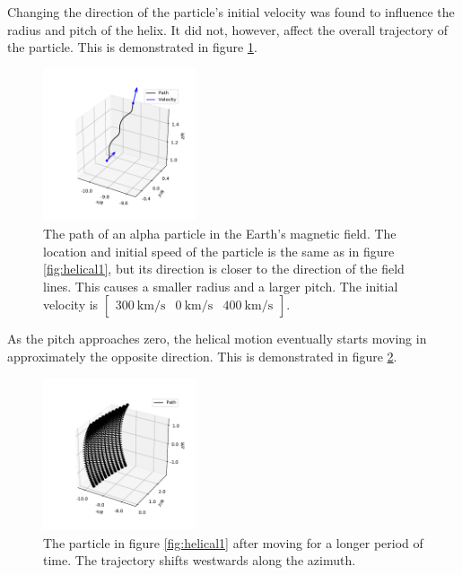 \documentclass[5p,sort&compress]{elsarticle}
\begin{document}
Changing the direction of the particle's initial velocity was found to influence the radius and pitch of the helix. It did not, however, affect the overall trajectory of the particle. This is demonstrated in figure \ref{fig:helical2}.

\begin{figure}[h]
    \centering
    \includegraphics[width=0.4\textwidth]{figure0.pdf}
    \caption{The path of an alpha particle in the Earth's magnetic field. The location and initial speed of the particle is the same as in figure \ref{fig:helical1}, but its direction is closer to the direction of the field lines. This causes a smaller radius and a larger pitch. The initial velocity is $\begin{bmatrix} \SI{300}{\kilo \meter /\second}&\SI{0}{\kilo \meter /\second}&\SI{400}{\kilo \meter /\second} \end{bmatrix}$.}
    \label{fig:helical2}
\end{figure}

As the pitch approaches zero, the helical motion eventually starts moving in approximately the opposite direction. This is demonstrated in figure \ref{fig:helical3}.

\begin{figure}[h]
    \centering
    \includegraphics[width=0.4\textwidth]{figure2.pdf}
    \caption{The particle in figure \ref{fig:helical1} after moving for a longer period of time. The trajectory shifts westwards along the azimuth.}
    \label{fig:helical3}
\end{figure}
\end{document}
